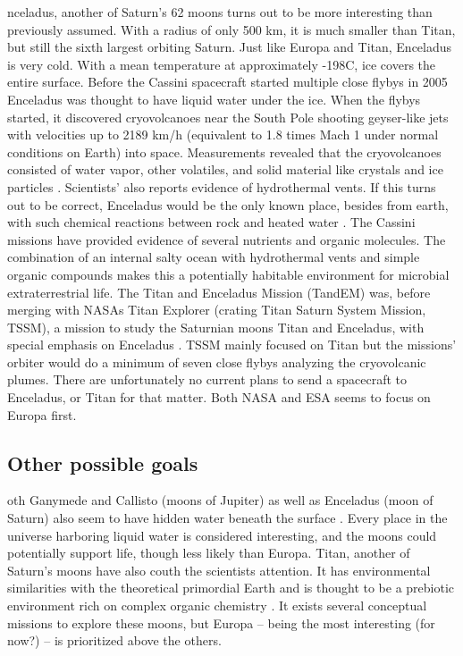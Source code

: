 \begin{multicols}{2}

 
nceladus, another of Saturn’s 62 moons turns out to be more interesting than previously assumed.
With a radius of only 500 km, it is much smaller than Titan, but still the sixth largest orbiting Saturn.
Just like Europa and Titan, Enceladus is very cold.
With a mean temperature at approximately -198\degree C, ice covers the entire surface.
Before the Cassini spacecraft started multiple close flybys in 2005 Enceladus was thought to have liquid water under the ice.
When the flybys started, it discovered cryovolcanoes near the South Pole shooting geyser-like jets with velocities up to 2189 km/h (equivalent to 1.8 times Mach 1 under normal conditions on Earth) into space.
Measurements revealed that the cryovolcanoes consisted of water vapor, other volatiles, and solid material like crystals and ice particles \cite{Enceladus1}.
Scientists’ also reports evidence of hydrothermal vents.
If this turns out to be correct, Enceladus would be the only known place, besides from earth, with such chemical reactions between rock and heated water \cite{FPlan09}.
The Cassini missions have provided evidence of several nutrients and organic molecules.
The combination of an internal salty ocean with hydrothermal vents and simple organic compounds makes this a potentially habitable environment for microbial extraterrestrial life.
The Titan and Enceladus Mission (TandEM) was, before merging with NASAs Titan Explorer (crating Titan Saturn System Mission, TSSM), a mission to study the Saturnian moons Titan and Enceladus, with special emphasis on Enceladus \cite{FPlan11}.
TSSM mainly focused on Titan but the missions’ orbiter would do a minimum of seven close flybys analyzing the cryovolcanic plumes.
There are unfortunately no current plans to send a spacecraft to Enceladus, or Titan for that matter.
Both NASA and ESA seems to focus on Europa first.
\fi

\subsection{Other possible goals}

oth Ganymede and Callisto (moons of Jupiter) as well as Enceladus (moon of Saturn) also seem to have hidden water beneath the surface \cite{FPlan09}.
Every place in the universe harboring liquid water is considered interesting, and the moons could potentially support life, though less likely than Europa.
Titan, another of Saturn’s moons have also couth the scientists attention.
It has environmental similarities with the theoretical primordial Earth and is thought to be a prebiotic environment rich on complex organic chemistry \cite{RichOrganics}.
It exists several conceptual missions to explore these moons, but Europa – being the most interesting (for now?) – is prioritized above the others.


\end{multicols}
